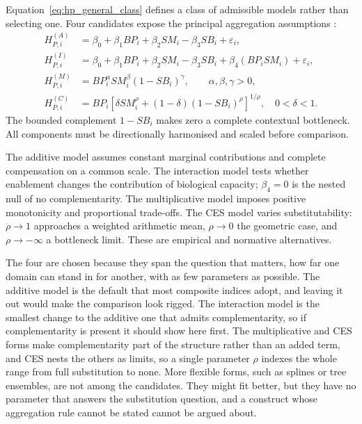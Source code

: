 Equation~\ref{eq:hp_general_class} defines a class of admissible models rather
than selecting one. Four candidates expose the principal aggregation assumptions \citep{arrow_chenery_1961}:
\begin{align}
H_{P,i}^{(A)}&=\beta_0+\beta_1BP_i+\beta_2SM_i-\beta_3SB_i+\varepsilon_i,
\label{eq:hp_additive}\\
H_{P,i}^{(I)}&=\beta_0+\beta_1BP_i+\beta_2SM_i-\beta_3SB_i
+\beta_4(BP_iSM_i)+\varepsilon_i,
\label{eq:hp_interaction}\\
H_{P,i}^{(M)}&=BP_i^{\alpha}SM_i^{\beta}(1-SB_i)^{\gamma},
\qquad \alpha,\beta,\gamma>0,
\label{eq:hp_multiplicative}\\
H_{P,i}^{(C)}&=BP_i\left[\delta SM_i^{\rho}
+(1-\delta)(1-SB_i)^{\rho}\right]^{1/\rho},
\quad 0<\delta<1.
\label{eq:hp_ces}
\end{align}
The bounded complement $1-SB_i$ makes zero a complete contextual bottleneck.
All components must be directionally harmonised and scaled before comparison.

The additive model assumes constant marginal contributions and complete
compensation on a common scale. The interaction model tests whether enablement
changes the contribution of biological capacity; $\beta_4=0$ is the nested null
of no complementarity. The multiplicative model imposes positive monotonicity
and proportional trade-offs. The CES \citep{arrow_chenery_1961} model varies substitutability:
$\rho\rightarrow1$ approaches a weighted arithmetic mean,
$\rho\rightarrow0$ the geometric case, and $\rho\rightarrow-\infty$ a
bottleneck limit. These are empirical and normative alternatives.

The four are chosen because they span the question that matters, how far one
domain can stand in for another, with as few parameters as possible. The
additive model is the default that most composite indices adopt, and leaving it
out would make the comparison look rigged. The interaction model is the
smallest change to the additive one that admits complementarity, so if
complementarity is present it should show here first. The multiplicative and
CES forms make complementarity part of the structure rather than an added
term, and CES nests the others as limits, so a single parameter $\rho$ indexes
the whole range from full substitution to none. More flexible forms, such as
splines or tree ensembles, are not among the candidates. They might fit
better, but they have no parameter that answers the substitution question, and
a construct whose aggregation rule cannot be stated cannot be argued about.


